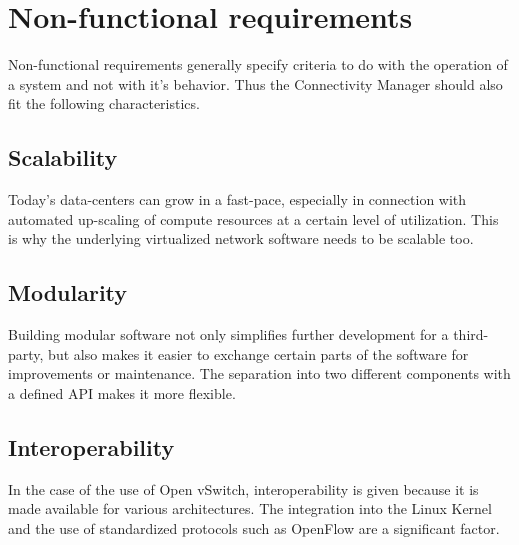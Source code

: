 \section{Non-functional requirements}

Non-functional requirements generally specify criteria to do with the operation of a system and not with it's behavior. Thus the Connectivity Manager should also fit the following characteristics.

\subsection{Scalability}

Today's data-centers can grow in a fast-pace, especially in connection with automated up-scaling of compute resources at a certain level of utilization. This is why the underlying virtualized network software needs to be scalable too.

\subsection{Modularity}

Building modular software not only simplifies further development for a third-party, but also makes it easier to exchange certain parts of the software for improvements or maintenance. The separation into two different components with a defined API makes it more flexible.

\subsection{Interoperability}

In the case of the use of Open vSwitch, interoperability is given because it is made available for various architectures. The integration into the Linux Kernel and the use of standardized protocols such as OpenFlow are a significant factor.